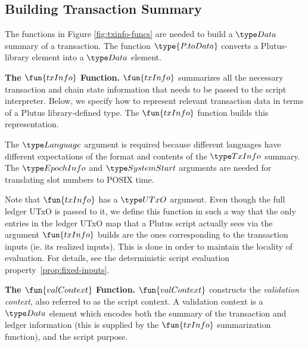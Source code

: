 \subsection{Building Transaction Summary}

The functions in Figure \ref{fig:txinfo-funcs} are needed to build a $\Data$ summary of a transaction.
The function $\type{P.toData}$ converts a Plutus-library element
into a $\Data$ element.

\textbf{The $\fun{txInfo}$ Function.}
$\fun{txInfo}$ summarizes all the necessary transaction and chain state information
    that needs to be passed to the script interpreter. Below, we specify how to
    represent relevant transaction data in terms of a Plutus
    library-defined type. The $\fun{txInfo}$ function builds this representation.

    The $\Language$ argument
    is required because different languages have different expectations of the
    format and contents of the $\TxInfo$ summary. The $\EpochInfo$ and $\SystemStart$
    arguments are needed for translating slot numbers to POSIX time.

    Note that $\fun{txInfo}$ has a $\UTxO$ argument. Even though the full ledger UTxO
    is passed to it, we define this function in such a way that the only
    entries in the ledger UTxO map that a Plutus script
    actually sees via the argument $\fun{txInfo}$ builds are the ones corresponding to the transaction
    inputs (ie. its realized inputs). This is done in order to maintain the locality of
    evaluation. For details, see the deterministic script evaluation property~\ref{prop:fixed-inputs}.

\textbf{The $\fun{valContext}$ Function.}
    $\fun{valContext}$ constructs the \emph{validation context}, also referred to as the
    script context. A validation context is
    a $\Data$ element which encodes both the summary of the transaction and ledger information
    (this is supplied by the $\fun{txInfo}$ summarization function), and the script purpose.

